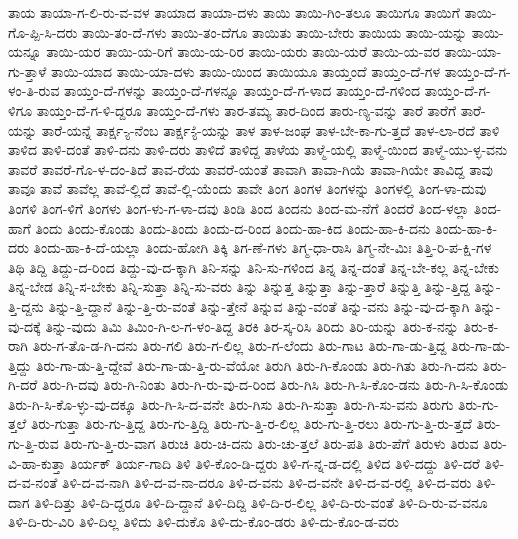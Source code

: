 {ತಾಯ
ತಾಯಾ-ಗ-ಲಿ-ರು-ವ-ವಳ
ತಾಯಾದ
ತಾಯಾ-ದಳು
ತಾಯಿ
ತಾಯಿ-ಗಿಂ-ತಲೂ
ತಾಯಿಗೂ
ತಾಯಿಗೆ
ತಾಯಿ-ಗೊ-ಪ್ಪಿ-ಸಿ-ದರು
ತಾಯಿ-ತಂ-ದೆ-ಗಳು
ತಾಯಿ-ತಂ-ದೆಗೂ
ತಾಯಿತು
ತಾಯಿ-ಬೇರು
ತಾಯಿಯ
ತಾಯಿ-ಯನ್ನು
ತಾಯಿ-ಯನ್ನೂ
ತಾಯಿ-ಯರ
ತಾಯಿ-ಯ-ರಿಗೆ
ತಾಯಿ-ಯ-ರಿರ
ತಾಯಿ-ಯರು
ತಾಯಿ-ಯರೆ
ತಾಯಿ-ಯ-ವರ
ತಾಯಿ-ಯಾ-ಗು-ತ್ತಾಳೆ
ತಾಯಿ-ಯಾದ
ತಾಯಿ-ಯಾ-ದಳು
ತಾಯಿ-ಯಿಂದ
ತಾಯಿಯೂ
ತಾಯ್ತಂದೆ
ತಾಯ್ತಂ-ದೆ-ಗಳ
ತಾಯ್ತಂ-ದೆ-ಗ-ಳಂ-ತಿ-ರುವ
ತಾಯ್ತಂ-ದೆ-ಗಳನ್ನು
ತಾಯ್ತಂ-ದೆ-ಗಳನ್ನೂ
ತಾಯ್ತಂ-ದೆ-ಗ-ಳಾದ
ತಾಯ್ತಂ-ದೆ-ಗಳಿಂದ
ತಾಯ್ತಂ-ದೆ-ಗ-ಳಿಗೂ
ತಾಯ್ತಂ-ದೆ-ಗ-ಳಿ-ದ್ದರೂ
ತಾಯ್ತಂ-ದೆ-ಗಳು
ತಾರ-ತಮ್ಯ
ತಾರ-ದಿಂದ
ತಾರು-ಣ್ಯ-ವನ್ನು
ತಾರೆ
ತಾರೆಗೆ
ತಾರೆ-ಯನ್ನು
ತಾರೆ-ಯನ್ನೆ
ತಾರ್ಕ್ಷ-್ಯ-ನೆಂಬ
ತಾರ್ಕ್ಷ-್ಯೆ-ಯನ್ನು
ತಾಳ
ತಾಳ-ಜಂಘ
ತಾಳ-ಬೇ-ಕಾ-ಗು-ತ್ತದೆ
ತಾಳ-ಲಾ-ರದೆ
ತಾಳಿ
ತಾಳಿದ
ತಾಳಿ-ದಂತೆ
ತಾಳಿ-ದನು
ತಾಳಿ-ದರು
ತಾಳಿದೆ
ತಾಳಿದ್ದ
ತಾಳೆಯ
ತಾಳ್ಮೆ-ಯಲ್ಲಿ
ತಾಳ್ಮೆ-ಯಿಂದ
ತಾಳ್ಮೆ-ಯು-ಳ್ಳ-ವನು
ತಾವರೆ
ತಾವರೆ-ಗೊ-ಳ-ದಂ-ತಿದೆ
ತಾವ-ರೆಯ
ತಾವರೆ-ಯಂತೆ
ತಾವಾಗಿ
ತಾವಾ-ಗಿಯೆ
ತಾವಾ-ಗಿಯೇ
ತಾವಿದ್ದ
ತಾವು
ತಾವೂ
ತಾವೆ
ತಾವೆಲ್ಲ
ತಾವೆ-ಲ್ಲಿದೆ
ತಾವೆ-ಲ್ಲಿ-ಯೆಂದು
ತಾವೇ
ತಿಂಗ
ತಿಂಗಳ
ತಿಂಗಳನ್ನು
ತಿಂಗಳಲ್ಲಿ
ತಿಂಗ-ಳಾ-ದುವು
ತಿಂಗಳಿ
ತಿಂಗ-ಳಿಗೆ
ತಿಂಗಳು
ತಿಂಗ-ಳು-ಗ-ಳಾ-ದವು
ತಿಂಡಿ
ತಿಂದ
ತಿಂದನು
ತಿಂದ-ಮ-ನೆಗೆ
ತಿಂದರೆ
ತಿಂದ-ಳಲ್ಲಾ
ತಿಂದ-ಹಾಗೆ
ತಿಂದು
ತಿಂದು-ಕೊಂಡು
ತಿಂದು-ತಿಂದು
ತಿಂದು-ದ-ರಿಂದ
ತಿಂದು-ಹಾ-ಕಿದ
ತಿಂದು-ಹಾ-ಕಿ-ದನು
ತಿಂದು-ಹಾ-ಕಿ-ದರು
ತಿಂದು-ಹಾ-ಕಿ-ದೆ-ಯಲ್ಲಾ
ತಿಂದು-ಹೋಗಿ
ತಿಕ್ಕಿ
ತಿಗ-ಣೆ-ಗಳು
ತಿಗ್ಮ-ಧಾ-ರಾಸಿ
ತಿಗ್ಮ-ನೇ-ಮಿಃ
ತಿತ್ತಿ-ರಿ-ಪ-ಕ್ಷಿ-ಗಳ
ತಿಥಿ
ತಿದ್ದಿ
ತಿದ್ದು-ದ-ರಿಂದ
ತಿದ್ದು-ವು-ದ-ಕ್ಕಾಗಿ
ತಿನಿ-ಸನ್ನು
ತಿನಿ-ಸು-ಗಳಿಂದ
ತಿನ್ನ
ತಿನ್ನ-ದಂತೆ
ತಿನ್ನ-ಬೇ-ಕಲ್ಲ
ತಿನ್ನ-ಬೇಕು
ತಿನ್ನ-ಬೇಡ
ತಿನ್ನಿ-ಸ-ಬೇಕು
ತಿನ್ನಿ-ಸುತ್ತಾ
ತಿನ್ನಿ-ಸು-ವರು
ತಿನ್ನು
ತಿನ್ನುತ್ತ
ತಿನ್ನುತ್ತಾ
ತಿನ್ನು-ತ್ತಾರೆ
ತಿನ್ನುತ್ತಿ
ತಿನ್ನು-ತ್ತಿದ್ದ
ತಿನ್ನು-ತ್ತಿ-ದ್ದನು
ತಿನ್ನು-ತ್ತಿ-ದ್ದಾನೆ
ತಿನ್ನು-ತ್ತಿ-ರು-ವಂತೆ
ತಿನ್ನು-ತ್ತೇನೆ
ತಿನ್ನುವ
ತಿನ್ನು-ವಂತೆ
ತಿನ್ನು-ವನು
ತಿನ್ನು-ವು-ದ-ಕ್ಕಾಗಿ
ತಿನ್ನು-ವು-ದಕ್ಕೆ
ತಿನ್ನು-ವುದು
ತಿಮಿ
ತಿಮಿಂ-ಗಿ-ಲ-ಗ-ಳಂ-ತಿದ್ದ
ತಿರಕಿ
ತಿರ-ಸ್ಕ-ರಿಸಿ
ತಿರಿದು
ತಿರಿ-ಯನ್ನು
ತಿರು-ಕ-ನನ್ನು
ತಿರು-ಕ-ರಾಗಿ
ತಿರು-ಗ-ತೊ-ಡ-ಗಿ-ದನು
ತಿರು-ಗಲಿ
ತಿರು-ಗ-ಲಿಲ್ಲ
ತಿರು-ಗ-ಲೆಂದು
ತಿರು-ಗಾಟ
ತಿರು-ಗಾ-ಡು-ತ್ತಿದ್ದ
ತಿರು-ಗಾ-ಡು-ತ್ತಿದ್ದು
ತಿರು-ಗಾ-ಡು-ತ್ತಿ-ದ್ದೇವೆ
ತಿರು-ಗಾ-ಡು-ತ್ತಿ-ರು-ವೆಯೋ
ತಿರುಗಿ
ತಿರು-ಗಿ-ಕೊಂಡು
ತಿರು-ಗಿತು
ತಿರು-ಗಿ-ದನು
ತಿರು-ಗಿ-ದರೆ
ತಿರು-ಗಿ-ದವು
ತಿರು-ಗಿ-ನಿಂತು
ತಿರು-ಗಿ-ರು-ವು-ದ-ರಿಂದ
ತಿರು-ಗಿಸಿ
ತಿರು-ಗಿ-ಸಿ-ಕೊಂ-ಡನು
ತಿರು-ಗಿ-ಸಿ-ಕೊಂಡು
ತಿರು-ಗಿ-ಸಿ-ಕೊ-ಳ್ಳು-ವು-ದಕ್ಕೂ
ತಿರು-ಗಿ-ಸಿ-ದ-ವನೇ
ತಿರು-ಗಿಸು
ತಿರು-ಗಿ-ಸುತ್ತಾ
ತಿರು-ಗಿ-ಸು-ವನು
ತಿರುಗು
ತಿರು-ಗು-ತ್ತಲೆ
ತಿರು-ಗುತ್ತಾ
ತಿರು-ಗು-ತ್ತಿದ್ದ
ತಿರು-ಗು-ತ್ತಿದ್ದಿ
ತಿರು-ಗು-ತ್ತಿ-ರ-ಲಿಲ್ಲ
ತಿರು-ಗು-ತ್ತಿ-ರಲು
ತಿರು-ಗು-ತ್ತಿ-ರು-ತ್ತದೆ
ತಿರು-ಗು-ತ್ತಿ-ರುವ
ತಿರು-ಗು-ತ್ತಿ-ರು-ವಾಗ
ತಿರುಚಿ
ತಿರು-ಚಿ-ದನು
ತಿರು-ಚು-ತ್ತಲೆ
ತಿರು-ಪತಿ
ತಿರು-ಪೆಗೆ
ತಿರುಳು
ತಿರುವ
ತಿರು-ವಿ-ಹಾ-ಕುತ್ತಾ
ತಿರ್ಯಕ್
ತಿರ್ಯ-ಗಾದಿ
ತಿಳಿ
ತಿಳಿ-ಕೊಂ-ಡಿ-ದ್ದರು
ತಿಳಿ-ಗ-ನ್ನ-ಡ-ದಲ್ಲಿ
ತಿಳಿದ
ತಿಳಿ-ದದ್ದು
ತಿಳಿ-ದರೆ
ತಿಳಿ-ದ-ವ-ನಂತೆ
ತಿಳಿ-ದ-ವ-ನಾಗಿ
ತಿಳಿ-ದ-ವ-ನಾ-ದರೂ
ತಿಳಿ-ದ-ವನು
ತಿಳಿ-ದ-ವನೇ
ತಿಳಿ-ದ-ವ-ರಲ್ಲಿ
ತಿಳಿ-ದ-ವರು
ತಿಳಿ-ದಾಗ
ತಿಳಿ-ದಿತ್ತು
ತಿಳಿ-ದಿ-ದ್ದರೂ
ತಿಳಿ-ದಿ-ದ್ದಾನೆ
ತಿಳಿ-ದಿದ್ದಿ
ತಿಳಿ-ದಿ-ರ-ಲಿಲ್ಲ
ತಿಳಿ-ದಿ-ರು-ವಂತೆ
ತಿಳಿ-ದಿ-ರು-ವ-ವನೂ
ತಿಳಿ-ದಿ-ರು-ವಿರಿ
ತಿಳಿ-ದಿಲ್ಲ
ತಿಳಿದು
ತಿಳಿ-ದುಕೊ
ತಿಳಿ-ದು-ಕೊಂ-ಡರು
ತಿಳಿ-ದು-ಕೊಂ-ಡ-ವರು
}
